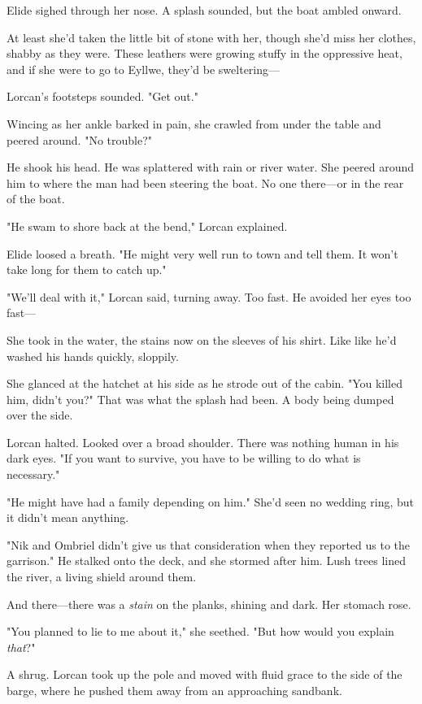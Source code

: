 Elide sighed through her nose. A splash sounded, but the boat ambled onward.

At least she'd taken the little bit of stone with her, though she'd miss her clothes, shabby as they were. These leathers were growing stuffy in the oppressive heat, and if she were to go to Eyllwe, they'd be sweltering---

Lorcan's footsteps sounded. "Get out."

Wincing as her ankle barked in pain, she crawled from under the table and peered around. "No trouble?"

He shook his head. He was splattered with rain or river water. She peered around him to where the man had been steering the boat. No one there---or in the rear of the boat.

"He swam to shore back at the bend," Lorcan explained.

Elide loosed a breath. "He might very well run to town and tell them. It won't take long for them to catch up."

"We'll deal with it," Lorcan said, turning away. Too fast. He avoided her eyes too fast---

She took in the water, the stains now on the sleeves of his shirt. Like
 like he'd washed his hands quickly, sloppily.

She glanced at the hatchet at his side as he strode out of the cabin. "You killed him, didn't you?" That was what the splash had been. A body being dumped over the side.

Lorcan halted. Looked over a broad shoulder. There was nothing human in his dark eyes. "If you want to survive, you have to be willing to do what is necessary."

"He might have had a family depending on him." She'd seen no wedding ring, but it didn't mean anything.

"Nik and Ombriel didn't give us that consideration when they reported us to the garrison." He stalked onto the deck, and she stormed after him. Lush trees lined the river, a living shield around them.

And there---there was a \emph{stain} on the planks, shining and dark. Her stomach rose.

"You planned to lie to me about it," she seethed. "But how would you explain \emph{that}?"

A shrug. Lorcan took up the pole and moved with fluid grace to the side of the barge, where he pushed them away from an approaching sandbank.

